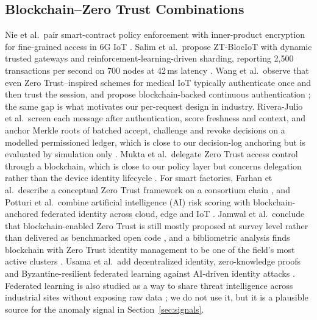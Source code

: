 \subsection{Blockchain--Zero Trust Combinations}
Nie et al.\ pair smart-contract policy enforcement with inner-product encryption for fine-grained access in 6G IoT \cite{nie2025zeroTrust}. Salim et al.\ propose ZT-BlocIoT with dynamic trusted gateways and reinforcement-learning-driven sharding, reporting 2{,}500 transactions per second on 700 nodes at 42\,ms latency \cite{salim2026ztblociot}. Wang et al.\ observe that even Zero Trust--inspired schemes for medical IoT typically authenticate once and then trust the session, and propose blockchain-backed continuous authentication \cite{wang2026medicaliot}; the same gap is what motivates our per-request design in industry. Rivera-Julio et al.\ screen each message after authentication, score freshness and context, and anchor Merkle roots of batched accept, challenge and revoke decisions on a modelled permissioned ledger, which is close to our decision-log anchoring but is evaluated by simulation only \cite{rivera2026yangbaxter}. Mukta et al.\ delegate Zero Trust access control through a blockchain, which is close to our policy layer but concerns delegation rather than the device identity lifecycle \cite{mukta2026ztdelegation}. For smart factories, Farhan et al.\ describe a conceptual Zero Trust framework on a consortium chain \cite{farhan2026ztfsf}, and Potturi et al.\ combine artificial intelligence (AI) risk scoring with blockchain-anchored federated identity across cloud, edge and IoT \cite{potturi2026hybrid}. Jamwal et al.\ conclude that blockchain-enabled Zero Trust is still mostly proposed at survey level rather than delivered as benchmarked open code \cite{jamwal2026survey}, and a bibliometric analysis finds blockchain with Zero Trust identity management to be one of the field's most active clusters \cite{liu2024dissecting}. Usama et al.\ add decentralized identity, zero-knowledge proofs and Byzantine-resilient federated learning against AI-driven identity attacks \cite{usama2026multilayer}. Federated learning is also studied as a way to share threat intelligence across industrial sites without exposing raw data \cite{tom2025flcti}; we do not use it, but it is a plausible source for the anomaly signal in Section~\ref{sec:signals}.


